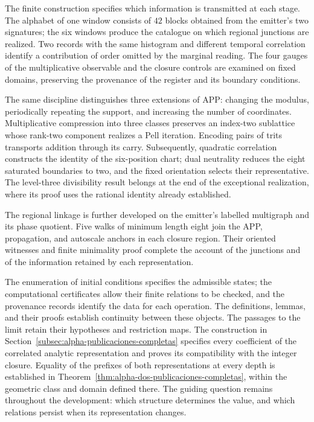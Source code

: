 

The finite construction specifies which information is transmitted at
each stage. The alphabet of one window consists of \(42\) blocks obtained
from the emitter's two signatures; the six windows produce the catalogue
on which regional junctions are realized. Two records with the same
histogram and different temporal correlation identify a contribution of
order omitted by the marginal reading. The four gauges of the
multiplicative observable and the closure controls are examined on fixed
domains, preserving the provenance of the register and its boundary
conditions.

The same discipline distinguishes three extensions of APP: changing the
modulus, periodically repeating the support, and increasing the number
of coordinates. Multiplicative compression into three classes preserves
an index-two sublattice whose rank-two component realizes a Pell
iteration. Encoding pairs of trits transports addition through its carry.
Subsequently, quadratic correlation constructs the identity of the
six-position chart; dual neutrality reduces the eight saturated boundaries
to two, and the fixed orientation selects their representative. The
level-three divisibility result belongs at the end of the exceptional
realization, where its proof uses the rational identity already established.

The regional linkage is further developed on the emitter's labelled
multigraph and its phase quotient. Five walks of minimum length eight
join the APP, propagation, and autoscale anchors in each closure region.
Their oriented witnesses and finite minimality proof complete the
account of the junctions and of the information retained by each
representation.


The enumeration of initial conditions specifies the admissible states;
the computational certificates allow their finite relations to be checked,
and the provenance records identify the data for each operation.
The definitions, lemmas, and their proofs establish continuity between
these objects. The passages to the limit retain their hypotheses and
restriction maps.
The construction in Section~\ref{subsec:alpha-publicaciones-completas}
specifies every coefficient of the correlated analytic representation and
proves its compatibility with the integer closure. Equality of the prefixes
of both representations at every depth is established in
Theorem~\ref{thm:alpha-dos-publicaciones-completas}, within the geometric
class and domain defined there.
The guiding question remains throughout
the development: which structure determines the value, and which relations persist
when its representation changes.


